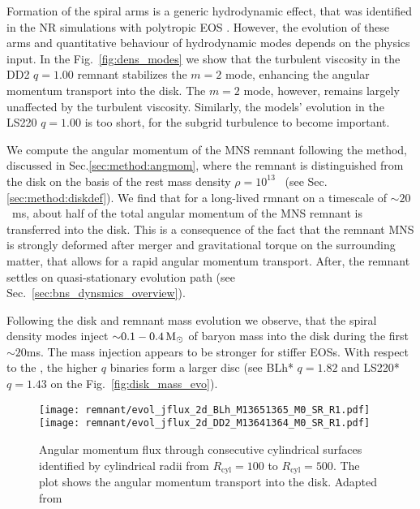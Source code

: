 Formation of the spiral arms is a generic hydrodynamic effect, that was identified 
in the \ac{NR} simulations with polytropic \ac{EOS} 
\citep{Bernuzzi:2013rza,Radice:2016gym}.
However, the evolution of these arms and quantitative behaviour of hydrodynamic
modes depends on the physics input. 
In the Fig.~\ref{fig:dens_modes} we show that the turbulent viscosity in the 
DD2 $q=1.00$ remnant stabilizes the $m=2$ mode, enhancing the angular momentum 
transport into the disk.
The $m=2$ mode, however, remains largely unaffected by the turbulent viscosity.
Similarly, the models' evolution in the LS220 $q=1.00$ is too short, for the 
subgrid turbulence to become important.

We compute the angular momentum of the \ac{MNS} remnant following the method,
discussed in Sec.\ref{sec:method:angmom}, where the remnant is distinguished 
from the disk on the basis of the rest mass density $\rho=10^{13}$~\gcm{} 
(see Sec.\ref{sec:method:diskdef}).
We find that for a long-lived rmnant 
on a timescale of $\sim20$~ms, about half of the total angular momentum 
of the \ac{MNS} remnant is transferred into the disk. 
This is a consequence of the fact that the remnant \ac{MNS} is strongly deformed 
after merger and gravitational torque on the surrounding matter, 
that allows for a rapid angular momentum transport.
After, the remnant settles on quasi-stationary evolution path 
(see Sec.~\ref{sec:bns_dynsmics_overview}).

Following the disk and remnant mass evolution we observe, that the spiral 
density modes inject ${\sim}0.1-0.4\,{\text{M}_{\odot}}$ of baryon mass into the disk during the 
first ${\sim}20$ms. 
The mass injection appears to be stronger for stiffer \acp{EOS}. 
With respect to the \mr{}, the higher $q$ binaries form a larger disc 
(see BLh* $q=1.82$ and LS220* $q=1.43$ on the Fig.~\ref{fig:disk_mass_evo}).

\begin{figure}[t]
    \centering 
    \texttt{[image: remnant/evol\_jflux\_2d\_BLh\_M13651365\_M0\_SR\_R1.pdf]}
    \texttt{[image: remnant/evol\_jflux\_2d\_DD2\_M13641364\_M0\_SR\_R1.pdf]}
    \caption{Angular momentum flux through consecutive cylindrical
        surfaces identified by cylindrical radii from $R_{\text{cyl}}=100$ to $R_{\text{cyl}}=500$. The
        plot shows the angular momentum transport into the disk.
        Adapted from \citet{Nedora:2020pak}
    }
    \label{fig:disk_ang_mom_flux_map_blh_q1}
\end{figure}

